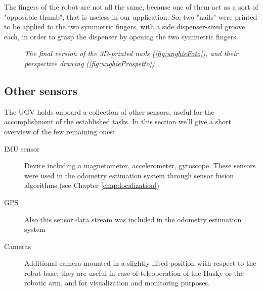 The fingers of the robot are not all the same, because one of them act as a sort of "opposable thumb", that is useless in our application. So, two "nails" were printed to be applied to the two symmetric fingers, with a side dispenser-sized groove each, in order to grasp the dispenser by opening the two symmetric fingers.

\begin{figure}
	\centering
	\caption{\textit{The final version of the 3D-printed nails (\ref{fig:unghieFoto}), and their 	perspective drawing (\ref{fig:unghieProspetto})}}
\end{figure}



\subsection{Other sensors}
The \ac{UGV} holds onboard a collection of other sensors, useful for the accomplishment of the established tasks. In this section we'll give a short overview of the few remaining ones:
\begin{description}
	\item[{IMU} sensor] Device including a magnetometer, accelerometer, gyroscope. These sensors were used in the odometry estimation system through sensor fusion algorithms (see Chapter \ref{chap:localization})
	\item[GPS] Also this sensor data stream was included in the odometry estimation system
	\item [Cameras] Additional camera mounted in a slightly lifted position with respect to the robot base; they are useful in case of teleoperation of the Husky or the robotic arm, and for visualization and monitoring purposes.
\end{description}


